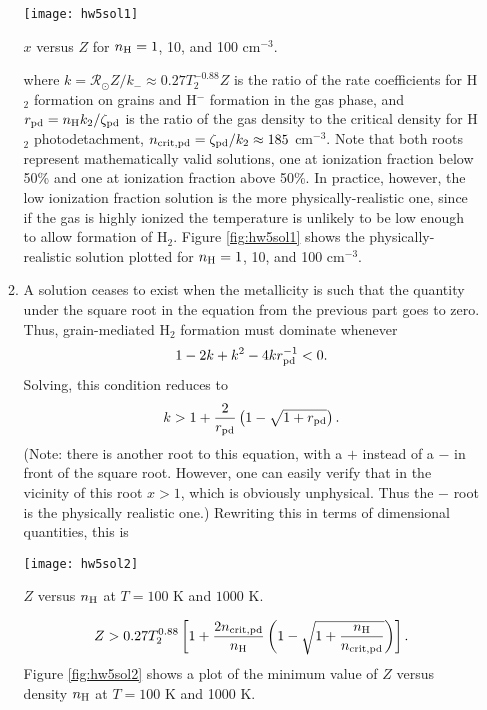 \begin{enumerate}
\begin{enumerate}
\begin{marginfigure}
\texttt{[image: hw5sol1]}
\caption[Solution to problem set~\thesolutionset, problem~\theenumi\theenumii]{
\label{fig:hw5sol1}
$x$ versus $Z$ for $n_{\rm H} = 1$, 10, and 100 cm$^{-3}$.
}
\end{marginfigure}
where $k = \mathcal{R}_{\odot} Z/k_{-}\approx 0.27 T_2^{-0.88} Z$ is the ratio of the rate coefficients for H$_2$ formation on grains and H$^-$ formation in the gas phase, and $r_{\rm pd} = n_{\rm H} k_2 / \zeta_{\rm pd}$ is the ratio of the gas density to the critical density for H$_2$ photodetachment, $n_{\rm crit,pd} = \zeta_{\rm pd}/k_2\approx 185$ cm$^{-3}$. Note that both roots represent mathematically valid solutions, one at ionization fraction below 50\% and one at ionization fraction above 50\%. In practice, however, the low ionization fraction solution is the more physically-realistic one, since if the gas is highly ionized the temperature is unlikely to be low enough to allow formation of H$_2$. Figure \ref{fig:hw5sol1} shows the physically-realistic solution plotted for $n_{\rm H} = 1$, 10, and 100 cm$^{-3}$.

\item A solution ceases to exist when the metallicity is such that the quantity under the square root in the equation from the previous part goes to zero. Thus, grain-mediated H$_2$ formation must dominate whenever
\begin{displaymath}
1 - 2k + k^2 - 4 k r_{\rm pd}^{-1} < 0.
\end{displaymath}
Solving, this condition reduces to
\begin{displaymath}
k > 1 + \frac{2}{r_{\rm pd}} \left(1 - \sqrt{1+r_{\rm pd}}\right).
\end{displaymath}
(Note: there is another root to this equation, with a $+$ instead of a $-$ in front of the square root. However, one can easily verify that in the vicinity of this root $x>1$, which is obviously unphysical. Thus the $-$ root is the physically realistic one.) Rewriting this in terms of dimensional quantities, this is
\begin{marginfigure}
\texttt{[image: hw5sol2]}
\caption[Solution to problem set~\thesolutionset, problem~\theenumi\theenumii]{
\label{fig:hw5sol2}
$Z$ versus $n_{\rm H}$ at $T=100$ K and $1000$ K.
}
\end{marginfigure}
\begin{displaymath}
Z > 0.27 T_2^{0.88} \left[1 + \frac{2 n_{\rm crit,pd}}{n_{\rm H}} \left(1 - \sqrt{1+\frac{n_{\rm H}}{n_{\rm crit,pd}}}\right)\right].
\end{displaymath}
Figure \ref{fig:hw5sol2} shows a plot of the minimum value of $Z$ versus density $n_{\rm H}$ at $T=100$ K and 1000 K.


\end{enumerate}
\end{enumerate}
